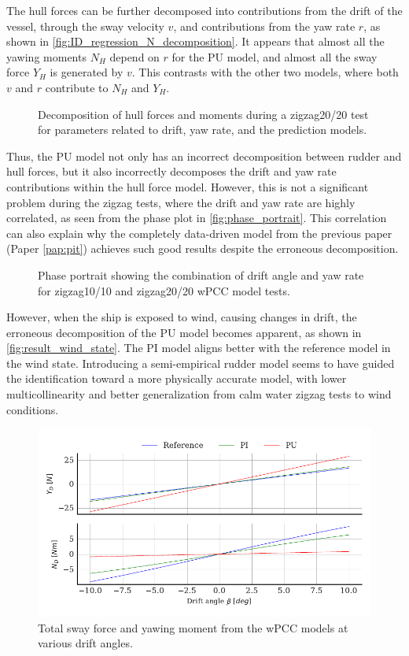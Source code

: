 The hull forces can be further decomposed into contributions from the drift of the vessel, through the sway velocity $v$, and contributions from the yaw rate $r$, as shown in \autoref{fig:ID_regression_N_decomposition}. It appears that almost all the yawing moments $N_H$ depend on $r$ for the PU model, and almost all the sway force $Y_H$ is generated by $v$. This contrasts with the other two models, where both $v$ and $r$ contribute to $N_H$ and $Y_H$.

\begin{figure}[h] \begin{center}  \caption{Decomposition of hull forces and moments during a zigzag20/20 test for parameters related to drift, yaw rate, and the prediction models.} \label{fig:ID_regression_N_decomposition} \end{center} \end{figure}

Thus, the PU model not only has an incorrect decomposition between rudder and hull forces, but it also incorrectly decomposes the drift and yaw rate contributions within the hull force model. However, this is not a significant problem during the zigzag tests, where the drift and yaw rate are highly correlated, as seen from the phase plot in \autoref{fig:phase_portrait}. This correlation can also explain why the completely data-driven model from the previous paper (Paper \ref{pap:pit}) achieves such good results despite the erroneous decomposition.

\begin{figure}[h] \centering  \caption{Phase portrait showing the combination of drift angle and yaw rate for zigzag10/10 and zigzag20/20 wPCC model tests.} \label{fig:phase_portrait} \end{figure}

However, when the ship is exposed to wind, causing changes in drift, the erroneous decomposition of the PU model becomes apparent, as shown in \autoref{fig:result_wind_state}. The PI model aligns better with the reference model in the wind state. Introducing a semi-empirical rudder model seems to have guided the identification toward a more physically accurate model, with lower multicollinearity and better generalization from calm water zigzag tests to wind conditions.

\begin{figure}[h!] \includegraphics[width=\textwidth]{kappa/images/result_wind_state.forces.pdf} \caption{Total sway force and yawing moment from the wPCC models at various drift angles.} \label{fig:result_wind_state} \end{figure}

\FloatBarrier \clearpage